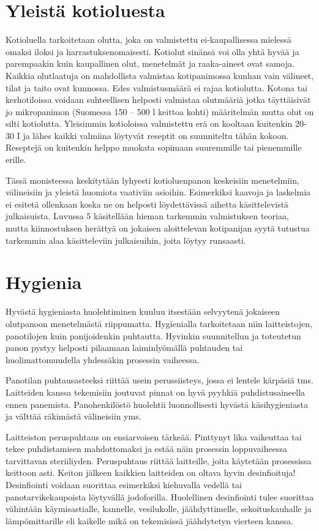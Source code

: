 \documentclass[a4paper,11pt]{report}
\begin{document}
\section{Yleistä kotioluesta}

Kotioluella tarkoitetaan olutta, joka on valmistettu ei-kaupallisessa mielessä omaksi iloksi ja harrastuksenomaisesti. Kotiolut sinänsä voi olla yhtä hyvää ja parempaakin kuin kaupallinen olut, menetelmät ja raaka-aineet ovat samoja. Kaikkia olutlaatuja on mahdollista valmistaa kotipanimossa kunhan vain välineet, tilat ja taito ovat kunnossa. Edes valmistusmäärä ei rajaa kotiolutta. Kotona tai kerhotiloissa voidaan suhteellisen helposti valmistaa olutmääriä jotka täyttäisivät jo mikropanimon (Suomessa 150 -- 500 l keittoa kohti) määritelmän mutta olut on silti kotiolutta. Yleisimmin kotioloissa valmistettu erä on kooltaan kuitenkin 20-30 I ja lähes kaikki valmiina löytyvät reseptit on suunniteltu tähän kokoon. Reseptejä on kuitenkin helppo muokata sopimaan suuremmille tai pienemmille erille.

Tässä monisteessa keskitytään lyhyesti kotioluenpanon keskeisiin menetelmiin, välineisiin ja yleistä huomiota vaativiin asioihin. Esimerkiksi kaavoja ja laskelmia ei esitetä ollenkaan koska ne on helposti löydettävissä aihetta käsittelevistä julkaisuista. Luvussa 5 käsitellään hieman tarkemmin valmistuksen teoriaa, mutta kiinnostuksen herättyä on jokaisen aloittelevan kotipanijan syytä tutustua tarkemmin alaa käsitteleviin julkaisuihin, joita löytyy runsaasti.

\section{Hygienia}

Hyvästä hygieniasta huolehtiminen kuuluu itsestään selvyytenä jokaiseen olutpanoon menetelmästä riippumatta. Hygienialla tarkoitetaan niin laitteistojen, panotilojen kuin panijoidenkin puhtautta. Hyvinkin suunnitellun ja toteutetun panon pystyy helposti pilaamaan laiminlyömällä puhtauden tai huolimattomuudella yhdessäkin prosessin vaiheessa.

Panotilan puhtausasteeksi riittää usein perussiisteys, jossa ei lentele kärpäsiä tms. Laitteiden kanssa tekemisiin joutuvat pinnat on hyvä pyyhkiä puhdistusaineella ennen panemista. Panohenkilöstö huolehtii luonnollisesti hyvästä käsihygieniasta ja välttää räkimästä välineisiin yms.

Laitteiston peruspuhtaus on ensiarvoisen tärkeää. Pinttynyt lika vaikeuttaa tai tekee puhdistamisen mahdottomaksi ja estää näin prosessin loppuvaiheessa tarvittavan steriiliyden. Peruspuhtaus riittää laitteille, joita käytetään prosessissa keittoon asti. Keiton jälkeen kaikkien laitteiden on oltava hyvin desinfioituja! Desinfiointi voidaan suorittaa esimerkiksi kiehuvalla vedellä tai panotarvikekaupoista löytyvällä jodoforilla. Huolellinen desinfiointi tulee suorittaa vähintään käymisastialle, kannelle, vesilukolle, jäähdyttimelle, sekoituskauhalle ja lämpömittarille eli kaikelle mikä on tekemisissä jäähdytetyn vierteen kanssa.
\end{document}
